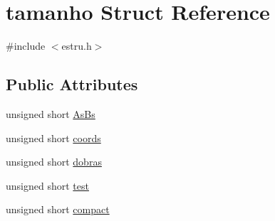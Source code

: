 \hypertarget{structtamanho}{\section{tamanho Struct Reference}
\label{structtamanho}
}


{\ttfamily \#include $<$estru.\-h$>$}

\subsection*{Public Attributes}
\begin{DoxyCompactItemize}
\item 
unsigned short \hyperlink{structtamanho_a05087a6446362b9c93abaf4f4efde68d}{As\-Bs}
\item 
unsigned short \hyperlink{structtamanho_abed6a8228728489f0c9be437089d37d0}{coords}
\item 
unsigned short \hyperlink{structtamanho_a2f92187ebcc581d9290dad7275b1abf2}{dobras}
\item 
unsigned short \hyperlink{structtamanho_af4704386b567f96738401a53a3459bb3}{test}
\item 
unsigned short \hyperlink{structtamanho_af8dfac00f645371e23cea496cc6432a6}{compact}
\end{DoxyCompactItemize}


